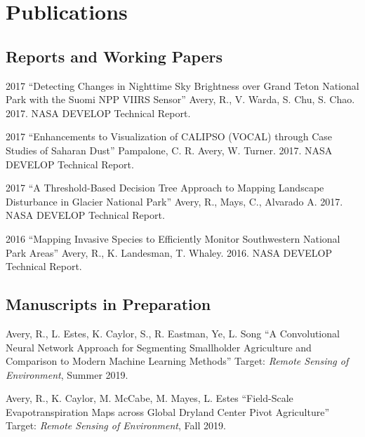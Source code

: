 \documentclass[12pt,letterpaper]{report}
\begin{document}
	
	
	\section*{Publications}
	
	
	\subsection*{Reports and Working Papers}
	
	\begin{tablist}
		
		\item[2017] \tab \enquote{Detecting Changes in Nighttime Sky Brightness over Grand Teton National Park with the Suomi NPP VIIRS Sensor} Avery, R., V. Warda, S. Chu, S. Chao. 2017. NASA DEVELOP Technical Report. 

	    \item[2017] \tab \enquote{Enhancements to Visualization of CALIPSO (VOCAL) through Case Studies of Saharan Dust} Pampalone, C. R. Avery, W. Turner. 2017. NASA DEVELOP Technical Report.

        \item[2017] \tab \enquote{A Threshold-Based Decision Tree Approach to Mapping Landscape Disturbance in Glacier National Park} Avery, R., Mays, C., Alvarado A. 2017. NASA DEVELOP Technical Report.

        \item[2016] \tab \enquote{Mapping Invasive Species to Efficiently Monitor Southwestern National Park Areas} Avery, R., K. Landesman, T. Whaley. 2016. NASA DEVELOP Technical Report.
	
	
    \subsection*{Manuscripts in Preparation}
	
	\begin{tablist}
				
		\item[\the\year] \tab Avery, R., L. Estes, K. Caylor, S., R. Eastman, Ye, L. Song \enquote{A Convolutional Neural Network Approach for Segmenting Smallholder Agriculture and Comparison to Modern Machine Learning Methods} Target: \textit{Remote Sensing of Environment}, Summer 2019.
		
		\item[\the\year] \tab Avery, R., K. Caylor, M. McCabe, M. Mayes, L. Estes \enquote{Field-Scale Evapotranspiration Maps across Global Dryland Center Pivot Agriculture} Target: \textit{Remote Sensing of Environment}, Fall 2019.
		

\end{tablist}
\end{tablist}
\end{document}
